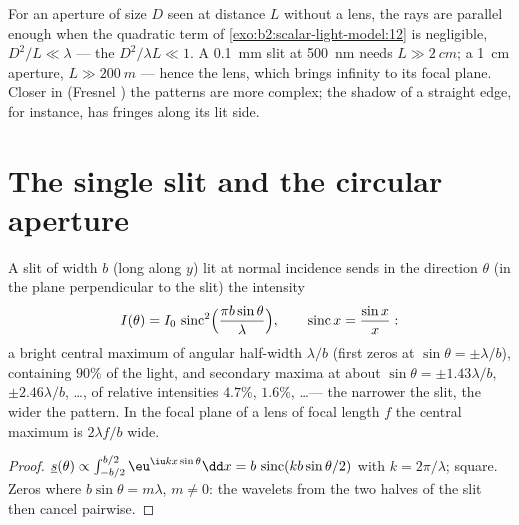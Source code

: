 \begin{remark}\label{rem:b2:diffraction:fresnelnumber}
For an aperture of size $D$ seen at distance $L$ without a lens, the
rays are parallel enough when the quadratic term of
\cref{exo:b2:scalar-light-model:12} is negligible, $D^2/L \ll \lambda$ ---
the \emph{} $D^2/\lambda L \ll 1$. A \qty{0.1}{mm} slit at
\qty{500}{nm} needs $L \gg \qty{2}{cm}$; a \qty{1}{cm} aperture, $L \gg \qty{200}{m}$ ---
hence the lens, which brings infinity to its focal plane. Closer in
(Fresnel ) the patterns are more complex; the shadow of a
straight edge, for instance, has fringes along its lit side.
\end{remark}

\section{The single slit and the circular aperture}

\begin{proposition}\label{prop:b2:diffraction:slit}
A slit of width $b$ (long along $y$) lit at normal incidence sends in
the direction $\theta$ (in the plane perpendicular to the slit) the
intensity
\[
I(\theta) = I_0\,\operatorname{sinc}^2\Bigl(\frac{\pi b\sin\theta}\lambda\Bigr) , \qquad \operatorname{sinc}x = \frac{\sin x}x :
\]
a bright central maximum of angular half-width $\lambda/b$ (first zeros at
$\sin\theta = \pm\lambda/b$), containing $90\%$ of the light, and secondary maxima
at about $\sin\theta = \pm1.43\lambda/b$, $\pm2.46\lambda/b$, \dots, of relative
intensities $4.7\%$, $1.6\%$, \dots --- the narrower the slit, the wider
the pattern. In the focal plane of a lens of focal length $f$ the
central maximum is $2\lambda f/b$ wide.
\end{proposition}

\begin{proof}
$\underline s(\theta) \propto \int_{-b/2}^{b/2}\eu^{\iu kx\sin\theta}\dd x = b\,\operatorname{sinc}(kb\sin\theta/2)$
with $k = 2\pi/\lambda$; square. Zeros where $b\sin\theta = m\lambda$, $m \ne 0$: the
wavelets from the two halves of the slit then cancel pairwise.
\end{proof}

